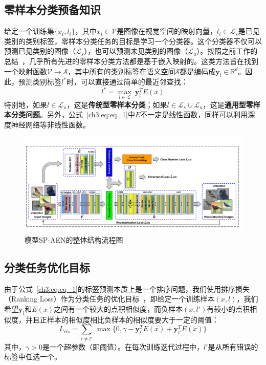 \subsection{零样本分类预备知识}
给定一个训练集$\{x_i, l_i\}$，其中$x_i\in\mathcal{V}$是图像在视觉空间的映射向量，$l_i\in \mathcal{L}_s$是已见类别的类别标签，零样本分类任务的目标是学习一个分类器。这个分类器不仅可以预测已见类别的图像（$\mathcal{L}_s$），也可以预测未见类别的图像（$\mathcal{L}_u$）。按照之前工作的总结~\cite{xian2017zero,lei2015predicting}，几乎所有先进的零样本分类方法都是基于嵌入映射的。这类方法旨在找到一个映射函数$\mathcal{V}\rightarrow \mathcal{S}$，其中所有的类别标签在语义空间$\mathcal{S}$都是编码成$\mathbf{y}_l\in\mathbb{R}^d$。因此，预测类别标签$l^*$时，可以直接通过简单的最近邻查找：
\begin{equation}\label{ch3:eq:eq_1}
l^* = \max_{l\in\mathcal{L}}~\mathbf{y}^T_l E(x)
\end{equation}
特别地，如果$l\in\mathcal{L}_u$，这是\textbf{传统型零样本分类}；如果$l \in\mathcal{L}_s\cup \mathcal{L}_u$，这是\textbf{通用型零样本分类问题}。另外，公式~\eqref{ch3:eq:eq_1}中$E$不一定是线性函数，同样可以利用深度神经网络等非线性函数。


\begin{figure}[tbp]
    \centering
        \includegraphics[width=\linewidth]{chapter3/res/sp_aen.pdf}
    \caption{模型SP-AEN的整体结构流程图}
    \label{ch3:fig:sp_aen}
\end{figure}


\subsection{分类任务优化目标}
由于公式~\eqref{ch3:eq:eq_1}的标签预测本质上是一个排序问题，我们使用排序损失（Ranking Loss）作为分类任务的优化目标~\cite{frome2013devise,weston2010large}，即给定一个训练样本$(x, l)$，我们希望$\mathbf{y}_l$和$E(x)$之间有一个较大的点积相似度，而负样本$(x,l')$有较小的点积相似度，并且正样本的相似度相比负样本的相似度要大于一定的阈值：
\begin{equation}\label{ch3:eq:eq_2}
L_{cls} = \sum\limits_{l\neq l'}~\max\{0, \gamma - \mathbf{y}_l^T E(x) + \mathbf{y}^T_{l'} E(x)\}
\end{equation}
其中，$\gamma >0$是一个超参数（即阈值）。在每次训练迭代过程中，$l'$是从所有错误的标签中任选一个。

